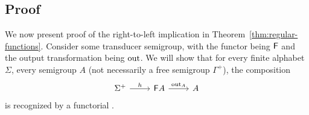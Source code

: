 



\subsection{Proof}

We now present proof of the right-to-left implication in Theorem~\ref{thm:regular-functions}. Consider some transducer semigroup, with the functor being $\mathsf F$ and the output transformation being $\mathrm{out}$. We will show that for every finite alphabet $\Sigma$, every semigroup $A$ (not necessarily a free semigroup $\Gamma^+$), the composition 
\[
    \begin{tikzcd}
    \Sigma^+ 
    \ar[r,"h"]
    &
    \functor A
    \ar[r,"\outfun_A"]
    &
    A
    \end{tikzcd}
    \]
is recognized by a functorial \sst.


